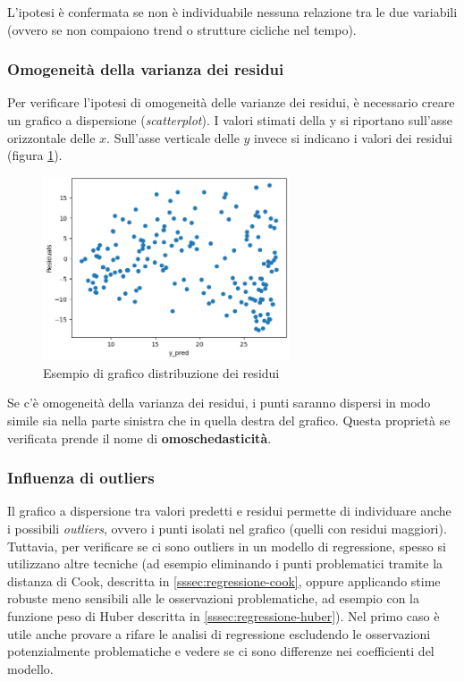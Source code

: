 L’ipotesi è confermata se non è individuabile nessuna relazione tra le due variabili (ovvero se non compaiono trend o strutture cicliche nel tempo).

\subsubsection{Omogeneità della varianza dei residui}\label{ssec:omogeneita-varianza}
Per verificare l’ipotesi di omogeneità delle varianze dei residui, è necessario creare un grafico a dispersione (\textit{scatterplot}). I valori stimati della y si riportano sull’asse orizzontale delle $x$. Sull’asse verticale delle $y$ invece si indicano i valori dei residui (figura \ref{fig:distr_residui}).

\begin{figure}[H]
\centering
\includegraphics[width=0.65\textwidth,height=\textheight,keepaspectratio]{img/distr_residui.png}
\caption{Esempio di grafico distribuzione dei residui}
\label{fig:distr_residui}
\end{figure}

Se c’è omogeneità della varianza dei residui, i punti saranno dispersi in modo simile sia nella parte sinistra che in quella destra del grafico. Questa proprietà se verificata prende il nome di \textbf{omoschedasticità}.

\subsubsection{Influenza di outliers}\label{ssec:influenza-outliers}
Il grafico a dispersione tra valori predetti e residui permette di individuare anche i possibili \textit{outliers}, ovvero i punti isolati nel grafico (quelli con residui maggiori).
Tuttavia, per verificare se ci sono outliers in un modello di regressione, spesso si utilizzano altre tecniche (ad esempio eliminando i punti problematici tramite la distanza di Cook, descritta in \ref{sssec:regressione-cook}, oppure applicando stime robuste meno sensibili alle le osservazioni problematiche, ad esempio con la funzione peso di Huber  descritta in \ref{sssec:regressione-huber}). Nel primo caso è utile anche provare a rifare le analisi di regressione escludendo le osservazioni potenzialmente problematiche e vedere se ci sono differenze nei coefficienti del modello.

